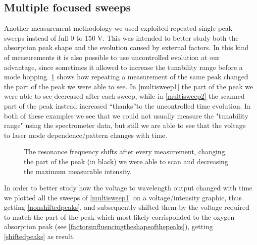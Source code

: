 		\subsection{Multiple focused sweeps}\label{focus}
Another measurement methodology we used exploited repeated single-peak sweeps instead of 
full 0 to 150 V. This was intended to better study both the absorption peak shape and the evolution caused by external factors. In this kind of measurements it is also possible to use uncontrolled evolution at our advantage, since sometimes it allowed to increase the tunability range before a mode hopping. \cref{multisweep} shows how repeating a measurement of the same peak changed the part of the peak we were able to see. In \cref{multisweep1} the part of the peak we were able to see decreased after each sweep, while in \cref{multisweep2} the scanned part of the peak instead increased \textquotedblleft thanks\textquotedblright to the uncontrolled time evolution.
In both of these examples we see that we could not usually measure the "tunability range" using the spectrometer data, but still we are able to see that 
the voltage to laser mode dependence/pattern changes with time. 

\begin{figure}[!phtb]\centering
{}
\caption{The resonance frequency shifts after every measurement, changing the part of the peak (in black) we were able to scan and decreasing the maximum measurable intensity.}
\label{multisweep}
\end{figure}

In order to better study how the voltage to wavelength output changed with time we plotted all the sweeps of \cref{multisweep1} on a voltage/intensity graphic, thus getting \cref{nonshiftedpeaks}, and subsequently shifted them by the voltage required to match the part of the peak which most likely corrisponded to the oxygen absorption peak (see \cref{factorsinfluencingtheshapeofthepeaks}), getting \cref{shiftedpeaks} as result.

\begin{figure}
\caption{}
\label{grafishifti}
\end{figure}

